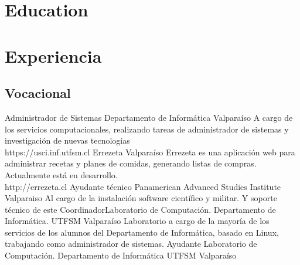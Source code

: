\documentclass[11pt,a4paper,sans]{moderncv}
\begin{document}
\makecvtitle

\section{Education}


\section{Experiencia}
\subsection{Vocacional}
                                {Administrador de Sistemas}
                                {Departamento de Informática}
                                {Valparaíso}
                                {}
                                {A cargo de los servicios computacionales, realizando tareas de administrador
                                de sistemas y investigación de nuevas tecnologías\\ https://usci.inf.utfsm.cl}
                                {Errezeta}
                                {Valparaíso}
                                {}
                                {Errezeta es una aplicación web para administrar recetas y planes de comidas,
                                generando listas de compras. Actualmente está en desarrollo.
                              \\ http://errezeta.cl}
                                {Ayudante técnico}
                                {Panamerican Advanced Studies Institute}
                                {Valparaiso}
                                {}
                                {Al cargo de la instalación software científico y militar. Y soporte técnico de este}
                                {Coordinador}{Laboratorio de Computación. Departamento de Informática. UTFSM}
                                {Valparaíso}
                                {}
                                {Laboratorio a cargo de la mayoría de los servicios de los alumnos del Departamento de Informática, 
                                basado en Linux, trabajando como administrador de sistemas.}
                                {Ayudante}
                                {Laboratorio de Computación. Departamento de Informática UTFSM}
                                {Valparaíso}{}{}
\end{document}
